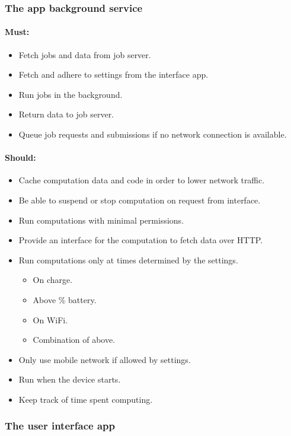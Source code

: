 \documentclass[a4paper,10pt]{article}
\begin{document}
\subsubsection{The app background service}

\paragraph{Must:}

\begin{itemize}
\item Fetch jobs and data from job server.
\item Fetch and adhere to settings from the interface app.
\item Run jobs in the background.
\item Return data to job server.
\item Queue job requests and submissions if no network connection is available.
\end{itemize}

\paragraph{Should:}

\begin{itemize}
\item Cache computation data and code in order to lower network traffic.
\item Be able to suspend or stop computation on request from interface.
\item Run computations with minimal permissions.
\item Provide an interface for the computation to fetch data over HTTP.
\item Run computations only at times determined by the settings.
\begin{itemize}
\item On charge.
\item Above \% battery.
\item On WiFi.
\item Combination of above.
\end{itemize}
\item Only use mobile network if allowed by settings.
\item Run when the device starts.
\item Keep track of time spent computing.
\end{itemize}

\subsubsection{The user interface app}
\end{document}
